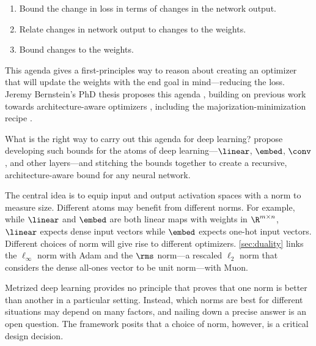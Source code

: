 \begin{enumerate}
    \item Bound the change in loss in terms of changes in the network output.
    \item Relate changes in network output to changes to the weights.
    \item Bound changes to the weights.
\end{enumerate}

This agenda gives a first-principles way to reason about creating an optimizer that will update the weights with the end goal in mind---reducing the loss. Jeremy Bernstein's PhD thesis proposes this agenda \citep{bernstein2022optimisationgeneralisationnetworks}, building on previous work towards architecture-aware optimizers \citep{bernstein2021distanceneuralnetworksstability,bernstein2023automaticgradientdescentdeep,liu2021learningturningneuralarchitecture}, including the majorization-minimization recipe \citep{lange2016mm, streeter2023universal}.


What is the right way to carry out this agenda for deep learning? \citet{large2024} propose developing such bounds for the atoms of deep learning---$\linear$, $\embed$, $\conv$, and other layers---and stitching the bounds together to create a recursive, architecture-aware bound for any neural network.

The central idea is to equip input and output activation spaces with a norm to measure size. Different atoms may benefit from different norms. For example, while $\linear$ and $\embed$ are both linear maps with weights in $\R^{m \times n}$, $\linear$ expects dense input vectors while $\embed$ expects one-hot input vectors. Different choices of norm will give rise to different optimizers. \cref{sec:duality} links the $\ell_\infty$ norm with Adam and the $\rms$ norm---a rescaled $\ell_2$ norm that considers the dense all-ones vector to be unit norm---with Muon.

Metrized deep learning provides no principle that proves that one norm is better than another in a particular setting. Instead, which norms are best for different situations may depend on many factors, and nailing down a precise answer is an open question. The framework posits that a choice of norm, however, is a critical design decision.


